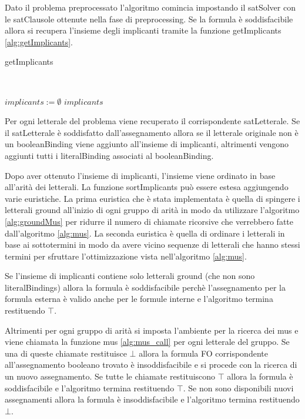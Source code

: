 \documentclass[./main.tex]{subfiles}
\begin{document}
Dato il problema preprocessato l'algoritmo comincia impostando il satSolver
con le satClausole ottenute nella fase di preprocessing. 
Se la formula è soddisfacibile allora si recupera l'insieme degli implicanti
tramite la funzione getImplicants \ref{alg:getImplicants}.

\begin{algorithm}[H] \label{alg:getImplicants}
    \caption{getImplicants}
    \\

$implicants := \emptyset$\;
\Return $implicants$\;
\end{algorithm}

Per ogni letterale del problema 
viene recuperato il corrispondente satLetterale.
Se il satLetterale è soddisfatto dall'assegnamento allora 
se il letterale originale non è un booleanBinding viene aggiunto all'insieme di implicanti,
altrimenti vengono aggiunti tutti i literalBinding associati al booleanBinding.

Dopo aver ottenuto l'insieme di implicanti, l'insieme viene ordinato in base all'arità dei letterali.
La funzione sortImplicants può essere estesa aggiungendo varie euristiche.
La prima euristica che è stata implementata è quella di spingere i letterali ground all'inizio di ogni gruppo di arità in modo da utilizzare 
l'algoritmo \ref{alg:groundMus} per ridurre il numero di chiamate ricorsive che verrebbero fatte dall'algoritmo \ref{alg:mus}.
La seconda euristica è quella di ordinare i letterali in base ai sottotermini in modo da avere vicino sequenze di letterali
che hanno stessi termini per sfruttare l'ottimizzazione vista nell'algoritmo \ref{alg:mus}.

Se l'insieme di implicanti contiene solo letterali ground (che non sono literalBindings) allora la formula è soddisfacibile
perchè l'assegnamento per la formula esterna è valido anche per le formule interne e l'algoritmo termina restituendo $\top$.

Altrimenti per ogni gruppo di arità si imposta l'ambiente per la ricerca dei mus
e viene chiamata la funzione mus \ref{alg:mus_call} per ogni letterale del gruppo.
Se una di queste chiamate restituisce $\bot$ allora la formula FO corrispondente 
all'assegnamento booleano trovato è insoddisfacibile e si procede con la ricerca di un nuovo assegnamento.
Se tutte le chiamate restituiscono $\top$ allora la formula è soddisfacibile e l'algoritmo termina restituendo $\top$.
Se non sono disponibili nuovi assegnamenti allora la formula è insoddisfacibile e l'algoritmo termina restituendo $\bot$.
\end{document}
